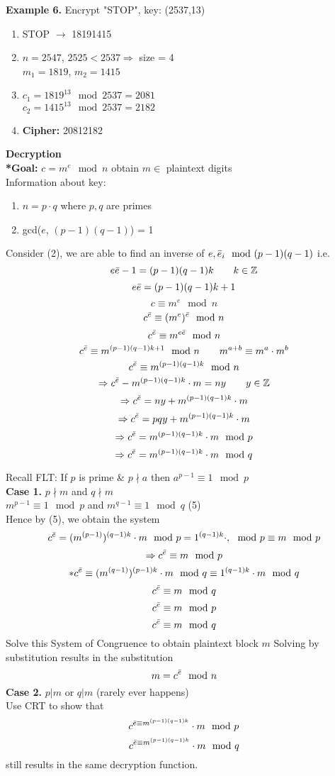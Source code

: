 \documentclass [12pt]{article}
\begin{document}
\noindent\textbf{Example 6.} Encrypt "STOP", key: (2537,13)
\begin{enumerate}[\quad1.]
    \item STOP $\rightarrow$ 18191415
    \item $n=2547$, $2525<2537\Rightarrow$ size = 4\\
    \quad $m_1=1819$, $m_2=1415$
    \item $c_1=1819^{13}\mod2537=2081$\\
    \quad $c_2=1415^13\mod2537=2182$
    \item \textbf{Cipher:} 20812182
\end{enumerate}
\pagebreak
\noindent\textbf{Decryption}\\
\textbf{*Goal:} $c=m^e\mod n$ obtain $m\in$ plaintext digits\\
Information about key:
\begin{enumerate}[\quad(1)]
    \item $n=p\cdot q$ where $p,q$ are primes
    \item gcd($e$, $(p-1)(q-1)$) = 1
\end{enumerate}
Consider (2), we are able to find an inverse of $e,\Bar{e}_i\mod (p-1)(q-1)$ i.e.\\
\[e\Bar{e}-1=(p-1)(q-1)k\quad\quad k\in\mathbb{Z}\]
\[e\Bar{e}=(p-1)(q-1)k+1\]
\[c\equiv m^e\mod n\]
\[c^{\Bar{e}}\equiv (m^e)^{\Bar{e}}\mod n\]
\[c^{\Bar{e}}\equiv m^{e{\Bar{e}}}\mod n\]
\[c^{\Bar{e}}\equiv m^{(p-1)(q-1)k+1}\mod n\quad\quad m^{a+b}\equiv m^a\cdot m^b\]
\[c^{\Bar{e}}\equiv m^{(p-1)(q-1)k}\mod n\]
\[\Rightarrow c^{\Bar{e}}-m^{(p-1)(q-1)k}\cdot m = ny\quad\quad y\in\mathbb{Z}\]
\[\Rightarrow c^{\Bar{e}}=ny+m^{(p-1)(q-1)k}\cdot m\]
\[\Rightarrow c^{\Bar{e}}=pqy+m^{(p-1)(q-1)k}\cdot m\]
\[\Rightarrow c^{\Bar{e}}=m^{(p-1)(q-1)k}\cdot m\mod p\]
\[\Rightarrow c^{\Bar{e}}=m^{(p-1)(q-1)k}\cdot m\mod q\]
\vspace{0.2in}


\noindent Recall FLT: If $p$ is prime \& $p\nmid a$ then $a^{p-1}\equiv 1\mod p$\\
\noindent\textbf{Case 1.} $p\nmid m$ and $q\nmid m$\\
\quad $m^{p-1}\equiv1\mod p$ and $m^{q-1}\equiv1\mod q$ (5)\\
Hence by (5), we obtain the system
\[c^{\Bar{e}}=(m^{(p-1)})^{(q-1)k}\cdot m\mod p = 1^{(q-1)k}\cdot ,\mod p\equiv m\mod p\]
\[\Rightarrow c^{\Bar{e}}\equiv m\mod p\]
\[*c^{\Bar{e}}\equiv(m^{(q-1)})^{(p-1)k}\cdot m \mod q \equiv 1^{(q-1)k}\cdot m\mod q\]
\[c^{\Bar{e}}\equiv m\mod q\]
\[c^{\Bar{e}}\equiv m\mod p\]
\[c^{\Bar{e}}\equiv m\mod q\]
Solve this System of Congruence to obtain plaintext block $m$
\pagebreak
Solving by substitution results in the substitution
\[m=c^{\Bar{e}}\mod n\]
\noindent\textbf{Case 2.} $p|m$ or $q|m$ (rarely ever happens)\\
Use CRT to show that 
\[c^{\Bar{e}\equiv m^{(p-1)(q-1)k}}\cdot m\mod p\]
\[c^{\Bar{e}\equiv m^{(p-1)(q-1)k}}\cdot m\mod q\]
still results in the same decryption function.\\
\vspace{0.2in}
\end{document}
